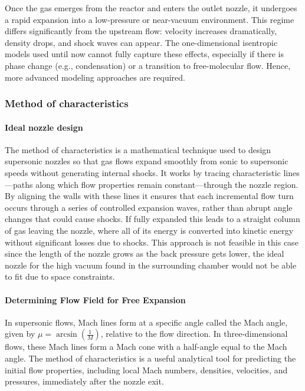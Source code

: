 Once the gas emerges from the reactor and enters the outlet nozzle, it undergoes a rapid expansion into a low-pressure or near-vacuum environment.
This regime differs significantly from the upstream flow: velocity increases dramatically, density drops, and shock waves can appear.
The one-dimensional isentropic models used until now cannot fully capture these effects, especially if there is phase change (e.g., condensation) or a transition to free-molecular flow.
Hence, more advanced modeling approaches are required.
\cite{jousten_handbook_2016, anderson2021modern}

\subsubsection*{Method of characteristics}

	\paragraph*{Ideal nozzle design}
		The method of characteristics is a mathematical technique used to design supersonic nozzles so that gas flows expand smoothly from sonic to supersonic speeds without generating internal shocks.
		It works by tracing characteristic lines—paths along which flow properties remain constant—through the nozzle region.
		By aligning the walls with these lines it ensures that each incremental flow turn occurs through a series of controlled expansion waves, rather than abrupt angle changes that could cause shocks.
		If fully expanded this leads to a straight column of gas leaving the nozzle, where all of its energy is converted into kinetic energy without significant losses due to shocks.
		This approach is not feasible in this case since the length of the nozzle grows as the back pressure gets lower, the ideal nozzle for the high vacuum found in the surrounding chamber would not be able to fit due to space constraints.
		\cite{khare_rocket_2021, fernandes_shape_2023}

	\paragraph*{Determining Flow Field for Free Expansion}
		In supersonic flows, Mach lines form at a specific angle called the Mach angle, given by $\mu = \arcsin\left(\frac{1}{M}\right)$, relative to the flow direction.
		In three-dimensional flows, these Mach lines form a Mach cone with a half-angle equal to the Mach angle.
		The method of characteristics is a useful analytical tool for predicting the initial flow properties, including local Mach numbers, densities, velocities, and pressures, immediately after the nozzle exit.

